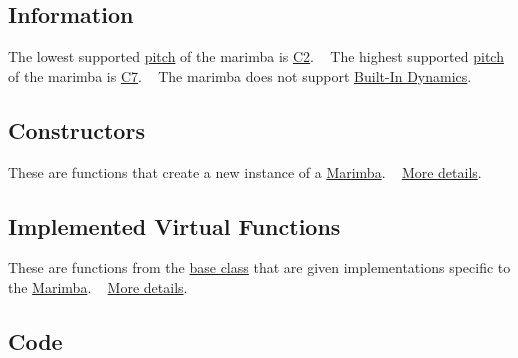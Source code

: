 \hypertarget{group___doc_mar_DocMarInfo}{}\subsection{Information}\label{group___doc_mar_DocMarInfo}
The lowest supported \hyperlink{group___music_enums_ga508f69b199ea518f935486c990edac1d}{pitch} of the marimba is \hyperlink{group___music_enums_gga508f69b199ea518f935486c990edac1daf1a543f5a2c5d49bc5dde298fcf716e4}{C2}. ~\newline
 The highest supported \hyperlink{group___music_enums_ga508f69b199ea518f935486c990edac1d}{pitch} of the marimba is \hyperlink{group___music_enums_gga508f69b199ea518f935486c990edac1da517d42f048d2dd422533522c796aaf37}{C7}. ~\newline
 The marimba does not support \hyperlink{group___audio_DefBID}{Built-\/\+In Dynamics}.\hypertarget{group___doc_mar_DocMarConstruct}{}\subsection{Constructors}\label{group___doc_mar_DocMarConstruct}
These are functions that create a new instance of a \hyperlink{class_marimba}{Marimba}. ~\newline
 \hyperlink{group___mar_construct}{More details}.\hypertarget{group___doc_mar_DocMarVirtFunc}{}\subsection{Implemented Virtual Functions}\label{group___doc_mar_DocMarVirtFunc}
These are functions from the \hyperlink{group___v_i_base}{base class} that are given implementations specific to the \hyperlink{class_marimba}{Marimba}. ~\newline
 \hyperlink{group___mar_virt_func}{More details}.\hypertarget{group___doc_mar_DocMarCode}{}\subsection{Code}\label{group___doc_mar_DocMarCode}

